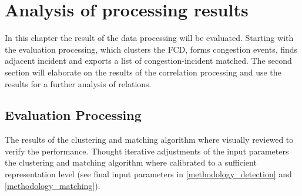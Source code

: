 \chapter{Analysis of processing results}
\label{analysis_processing}
In this chapter the result of the data processing will be evaluated. Starting with the evaluation processing, which clusters the FCD, forms congestion events, finds adjacent incident and exports a list of congestion-incident matched. The second section will elaborate on the results of the correlation processing and use the results for a further analysis of relations.

\section{Evaluation Processing}
\label{analysis_processing_evaluation}
The results of the clustering and matching algorithm where visually reviewed to verify the performance. Thought iterative adjustments of the input parameters the clustering and matching algorithm where calibrated to a sufficient representation level (see final input parameters in \cref{methodology_detection} and \cref{methodology_matching}).


